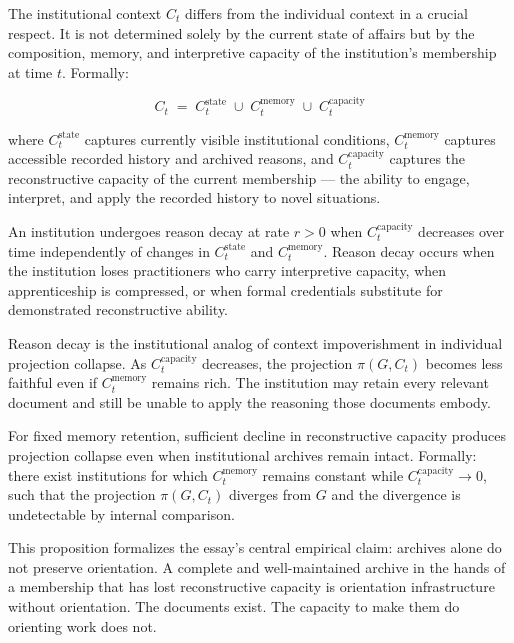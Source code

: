 The institutional context $C_t$ differs from the individual context in a
crucial respect. It is not determined solely by the current state of affairs
but by the composition, memory, and interpretive capacity of the institution's
membership at time $t$. Formally:

\[
C_t \;=\; C_t^{\text{state}} \;\cup\; C_t^{\text{memory}} \;\cup\; C_t^{\text{capacity}}
\]

where $C_t^{\text{state}}$ captures currently visible institutional conditions,
$C_t^{\text{memory}}$ captures accessible recorded history and archived
reasons, and $C_t^{\text{capacity}}$ captures the reconstructive capacity
of the current membership --- the ability to engage, interpret, and apply
the recorded history to novel situations.

\begin{defn}
An institution undergoes reason decay at rate $r > 0$ when $C_t^{\text{capacity}}$
decreases over time independently of changes in $C_t^{\text{state}}$ and
$C_t^{\text{memory}}$. Reason decay occurs when the institution loses
practitioners who carry interpretive capacity, when apprenticeship is
compressed, or when formal credentials substitute for demonstrated
reconstructive ability.
\end{defn}

Reason decay is the institutional analog of context impoverishment in
individual projection collapse. As $C_t^{\text{capacity}}$ decreases, the
projection $\pi(G, C_t)$ becomes less faithful even if $C_t^{\text{memory}}$
remains rich. The institution may retain every relevant document and still
be unable to apply the reasoning those documents embody.

\begin{proposition}
For fixed memory retention, sufficient decline in reconstructive capacity
produces projection collapse even when institutional archives remain intact.
Formally: there exist institutions for which $C_t^{\text{memory}}$ remains
constant while $C_t^{\text{capacity}} \to 0$, such that the projection
$\pi(G, C_t)$ diverges from $G$ and the divergence is undetectable by
internal comparison.
\end{proposition}

This proposition formalizes the essay's central empirical claim: archives
alone do not preserve orientation. A complete and well-maintained archive
in the hands of a membership that has lost reconstructive capacity is
orientation infrastructure without orientation. The documents exist. The
capacity to make them do orienting work does not.


